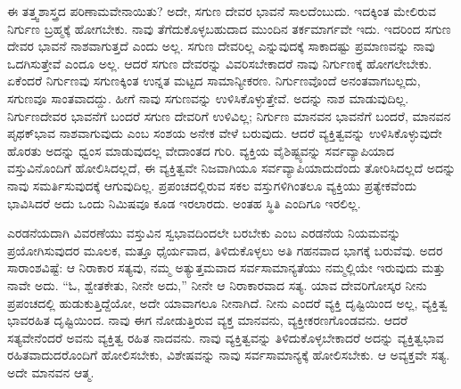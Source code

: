 ಈ ತತ್ತ್ವಶಾಸ್ತ್ರದ ಪರಿಣಾಮವೇನಾಯಿತು? ಅದೇ, ಸಗುಣ ದೇವರ ಭಾವನೆ ಸಾಲದೆಂಬುದು. ಇದಕ್ಕಿಂತ ಮೇಲಿರುವ ನಿರ್ಗುಣ ಬ್ರಹ್ಮಕ್ಕೆ ಹೋಗಬೇಕು. ನಾವು ತೆಗೆದುಕೊಳ್ಳಬಹುದಾದ ಮುಂದಿನ ತರ್ಕಮಾರ್ಗವೇ ಇದು. ಇದರಿಂದ ಸಗುಣ ದೇವರ ಭಾವನೆ ನಾಶವಾಗುತ್ತದೆ ಎಂದು ಅಲ್ಲ. ಸಗುಣ ದೇವರಿಲ್ಲ ಎನ್ನುವುದಕ್ಕೆ ಸಾಕಾದಷ್ಟು ಪ್ರಮಾಣವನ್ನು ನಾವು ಒದಗಿಸುತ್ತೇವೆ ಎಂದೂ ಅಲ್ಲ. ಆದರೆ ಸಗುಣ ದೇವರನ್ನು ವಿವರಿಸಬೇಕಾದರೆ ನಾವು ನಿರ್ಗುಣಕ್ಕೆ ಹೋಗಲೇಬೇಕು. ಏಕೆಂದರೆ ನಿರ್ಗುಣವು ಸಗುಣಕ್ಕಿಂತ ಉನ್ನತ ಮಟ್ಟದ ಸಾಮಾನ್ಯೀಕರಣ. ನಿರ್ಗುಣವೊಂದೆ ಅನಂತವಾಗಬಲ್ಲದು, ಸಗುಣವೂ ಸಾಂತವಾದದ್ದು. ಹೀಗೆ ನಾವು ಸಗುಣವನ್ನು ಉಳಿಸಿಕೊಳ್ಳುತ್ತೇವೆ. ಅದನ್ನು ನಾಶ ಮಾಡುವುದಿಲ್ಲ. ನಿರ್ಗುಣದೇವರ ಭಾವನೆಗೆ ಬಂದರೆ ಸಗುಣ ದೇವರಿಗೆ ಉಳಿವಿಲ್ಲ; ನಿರ್ಗುಣ ಮಾನವನ ಭಾವನೆಗೆ ಬಂದರೆ, ಮಾನವನ ಪೃಥಕ್​ಭಾವ ನಾಶವಾಗುವುದು ಎಂಬ ಸಂಶಯ ಅನೇಕ ವೇಳೆ ಬರುವುದು. ಆದರೆ ವ್ಯಕ್ತಿತ್ವವನ್ನು ಉಳಿಸಿಕೊಳ್ಳುವುದೇ ಹೊರತು ಅದನ್ನು ಧ್ವಂಸ ಮಾಡುವುದಲ್ಲ ವೇದಾಂತದ ಗುರಿ. ವ್ಯಕ್ತಿಯ ವೈಶಿಷ್ಟ್ಯವನ್ನು ಸರ್ವವ್ಯಾಪಿಯಾದ ವಸ್ತುವಿನೊಂದಿಗೆ ಹೋಲಿಸಿದಲ್ಲದೆ, ಈ ವ್ಯಕ್ತಿತ್ವವೇ ನಿಜವಾಗಿಯೂ ಸರ್ವವ್ಯಾಪಿಯಾದುದೆಂದು ತೋರಿಸಿದಲ್ಲದೆ ಅದನ್ನು ನಾವು ಸಮರ್ತಿಸುವುದಕ್ಕೆ ಆಗುವುದಿಲ್ಲ. ಪ್ರಪಂಚದಲ್ಲಿರುವ ಸಕಲ ವಸ್ತುಗಳಿಗಿಂತಲೂ ವ್ಯಕ್ತಿಯು ಪ್ರತ್ಯೇಕವೆಂದು ಭಾವಿಸಿದರೆ ಅದು ಒಂದು ನಿಮಿಷವೂ ಕೂಡ ಇರಲಾರದು. ಅಂತಹ ಸ್ಥಿತಿ ಎಂದಿಗೂ ಇರಲಿಲ್ಲ. 

\vskip 0.2cm

ಎರಡನೆಯದಾಗಿ ವಿವರಣೆಯು ವಸ್ತುವಿನ ಸ್ವಭಾವದಿಂದಲೇ ಬರಬೇಕು ಎಂಬ ಎರಡನೆಯ ನಿಯಮವನ್ನು ಪ್ರಯೋಗಿಸುವುದರ ಮೂಲಕ, ಮತ್ತೂ ಧೈರ್ಯವಾದ, ತಿಳಿದುಕೊಳ್ಳಲು ಅತಿ ಗಹನವಾದ ಭಾಗಕ್ಕೆ ಬರುವೆವು. ಅದರ ಸಾರಾಂಶವಿಷ್ಟೆ: ಆ ನಿರಾಕಾರ ಸತ್ಯವು, ನಮ್ಮ ಅತ್ಯುತ್ತಮವಾದ ಸರ್ವಸಾಮಾನ್ಯತೆಯು ನಮ್ಮಲ್ಲಿಯೇ ಇರುವುದು ಮತ್ತು ನಾವೇ ಅದು. “ಓ, ಶ್ವೇತಕೇತು, ನೀನೇ ಅದು,” ನೀನೇ ಆ ನಿರಾಕಾರವಾದ ಸತ್ಯ. ಯಾವ ದೇವರಿಗೋಸ್ಕರ ನೀನು ಪ್ರಪಂಚದಲ್ಲಿ ಹುಡುಕುತ್ತಿದ್ದೆಯೋ, ಅದೇ ಯಾವಾಗಲೂ ನೀನಾಗಿದೆ. ನೀನು ಎಂದರೆ ವ್ಯಕ್ತಿ ದೃಷ್ಟಿಯಿಂದ ಅಲ್ಲ, ವ್ಯಕ್ತಿತ್ವ ಭಾವರಹಿತ ದೃಷ್ಟಿಯಿಂದ. ನಾವು ಈಗ ನೋಡುತ್ತಿರುವ ವ್ಯಕ್ತ ಮಾನವನು, ವ್ಯಕ್ತೀಕರಣಗೊಂಡವನು. ಆದರೆ ಸತ್ಯವೇನೆಂದರೆ ಅವನು ವ್ಯಕ್ತಿತ್ವ ರಹಿತ ನಾದವನು. ನಾವು ವ್ಯಕ್ತಿತ್ವವನ್ನು ತಿಳಿದುಕೊಳ್ಳಬೇಕಾದರೆ ಅದನ್ನು ವ್ಯಕ್ತಿತ್ವಭಾವ ರಹಿತವಾದುದರೊಂದಿಗೆ ಹೋಲಿಸಬೇಕು, ವಿಶೇಷವನ್ನು ನಾವು ಸರ್ವಸಾಮಾನ್ಯಕ್ಕೆ ಹೋಲಿಸಬೇಕು. ಆ ಅವ್ಯಕ್ತವೇ ಸತ್ಯ. ಅದೇ ಮಾನವನ ಆತ್ಮ. 

\vskip 0.2cm

